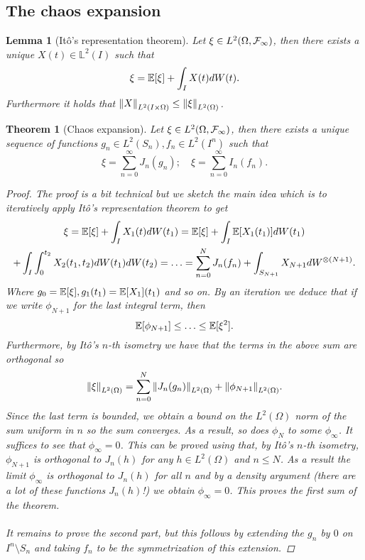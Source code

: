 \documentclass[13pt]{article}
\newtheorem{theorem}{Theorem}
\newtheorem{lemma}{Lemma}
\begin{document}
\subsection{The chaos expansion}
\begin{lemma}[Itô's representation theorem]
	Let $\xi\in L^2(\Omega,\mathcal{F}_\infty)$, then there exists a unique $X(t)\in \mathbb{L}^2(I)$ such that
	\begin{equation*}
		\xi=\mathbb{E}[\xi]+\int_{I} X(t)dW(t).
	\end{equation*}
	Furthermore it holds that $\norm{X}_{L^2(I\times\Omega)}\leq \norm{\xi}_{L^2(\Omega)}$.
\end{lemma}


\begin{theorem}[Chaos expansion]
	Let $\xi\in L^2(\Omega,\mathcal{F}_\infty)$, then there exists a unique sequence of functions $g_n \in L^2(S_n),f_n \in L^2(I^n)$ such that
	\begin{equation*}
		\xi=\sum_{n=0}^{\infty}  J_n(g_n);\quad \xi=\sum_{n=0}^{\infty} I_n(f_n).
	\end{equation*}
	\begin{proof}
		The proof is a bit technical but we sketch the main idea which is to iteratively apply Itô's representation theorem to get
		\begin{multline*}
			\xi=\mathbb{E}[\xi]+\int_I X_1(t)dW(t_1)=\mathbb{E}[\xi]+\int_{I} \mathbb{E}[X_1(t_1)] dW(t_1)\\+ \int_{I}\int_{0}^{t_2} X_2(t_1,t_2) dW(t_1)dW(t_2)= \ldots=\sum_{n=0}^{N}  J_n(f_n)+ \int_{S_{N+1}} X_{N+1} dW^{\otimes(N+1)}.
		\end{multline*}
		Where $g_0=\mathbb{E}[\xi], g_1(t_1) =\mathbb{E}[X_1](t_1)$ and so on. By an iteration we deduce that if we write $\phi_{N+1}$ for the last integral term, then
		\begin{equation*}
			\mathbb{E}[\phi_{N+1}]\leq\ldots\leq \mathbb{E}[\xi^2].
		\end{equation*}
		Furthermore, by Itô's $n$-th isometry we have that the terms in the above sum are orthogonal so
		\begin{equation*}
			\norm{\xi}_{L^2(\Omega)}=\sum_{n=0}^{N} \norm{J_n(g_n)}_{L^2(\Omega)} +\norm{\phi_{N+1}}_{L^2(\Omega)}.
		\end{equation*}
		Since the last term is bounded, we obtain a bound on the $L^2(\Omega)$ norm of the sum uniform in  $n$ so the sum converges. As a result, so does $\phi_N$  to some $\phi_\infty$. It suffices to see that $\phi_\infty=0$. This can be proved using that, by Itô's  $n$-th isometry, $\phi_{N+1}$ is orthogonal to  $J_n(h)$ for any $h\in L^2(\Omega)$ and $n\leq N$. As a result the limit $\phi_\infty$ is orthogonal to $J_n(h)$ for all  $n$  and by a density argument (there are a lot of these functions $J_n(h)$!) we obtain $\phi_\infty=0$. This proves the first sum of the theorem.\\\\
		It remains to prove the second part, but this follows by extending the $g_n$ by  $0$ on  $I^n\setminus S_n$ and taking $f_n$ to be the symmetrization of this extension.
	\end{proof}


\end{theorem}




\end{document}
